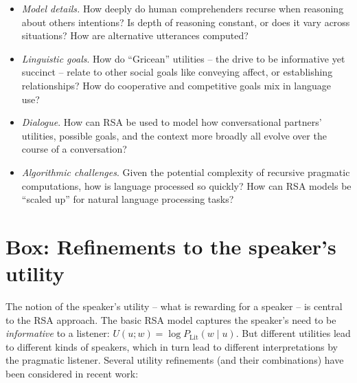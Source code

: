 \documentclass[]{elsarticle}
\begin{document}
\begin{itemize}
\item \emph{Model details.} How deeply do human comprehenders recurse when
  reasoning about others intentions? Is depth of reasoning constant, or
  does it vary across situations? How are alternative utterances
  computed?

%
\item \emph{Linguistic goals}. How do ``Gricean'' utilities -- the drive to be informative yet succinct -- relate to other social goals like conveying affect, or establishing relationships? How do cooperative and competitive goals mix in language use?

\item \emph{Dialogue}. How can RSA be used to model how conversational partners' utilities, possible goals, and the context more broadly all evolve over the course of a conversation?


\item \emph{Algorithmic challenges}. Given the potential complexity of
recursive pragmatic computations, how is language processed so quickly? How can RSA models be ``scaled up'' for natural language
  processing tasks?
%

\end{itemize}

\section{Box: Refinements to the speaker's utility}\label{box-refinements-to-the-speakers-utility}

The notion of the speaker's utility -- what is rewarding for a speaker -- is central to the RSA approach. The basic RSA model captures the speaker's need to be \emph{informative} to a listener: $U(u; w) = \log
P_{\text{Lit}}(w\mid u)$. But different utilities lead to different kinds of
speakers, which in turn lead to different interpretations by the pragmatic
listener. Several utility refinements (and their combinations) have been
considered in recent work:
\end{document}
